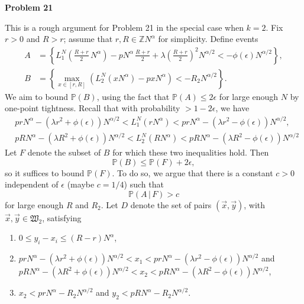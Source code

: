\documentclass[12pt]{article}
\begin{document}
	
	\begin{center}
		\large\textbf{Problem 21}
	\end{center}

	This is a rough argument for Problem 21 in the special case when $k=2$. Fix $r>0$ and $R>r$; assume that $r,R\in\mathbb{Z}N^\alpha$ for simplicity. Define events
	\begin{align*}
	A &= \left\{L_1^N\left(\frac{R+r}{2}\,N^\alpha\right) - pN^\alpha\,\frac{R+r}{2} + \lambda\left(\frac{R+r}{2}\right)^2 N^{\alpha/2} < -\phi(\epsilon)N^{\alpha/2}\right\},\\
	B &= \left\{\max_{x\in[r,R]} \left(L_2^N(xN^\alpha) - pxN^\alpha\right) < -R_2N^{\alpha/2} \right\}.
	\end{align*}
	We aim to bound $\mathbb{P}(B)$, using the fact that $\mathbb{P}(A) \leq 2\epsilon$ for large enough $N$ by one-point tightness. Recall that with probability $>1-2\epsilon$, we have 
	\begin{align*}
	& prN^\alpha - (\lambda r^2+\phi(\epsilon))N^{\alpha/2} < L_1^N(rN^\alpha) <  prN^\alpha - (\lambda r^2-\phi(\epsilon))N^{\alpha/2},\\
	& pRN^\alpha - (\lambda R^2+\phi(\epsilon))N^{\alpha/2} < L_2^N(RN^\alpha) <  pRN^\alpha - (\lambda R^2-\phi(\epsilon))N^{\alpha/2}
	\end{align*}
	Let $F$ denote the subset of $B$ for which these two inequalities hold. Then 
	\[
	\mathbb{P}(B) \leq \mathbb{P}(F) + 2\epsilon,
	\]
	so it suffices to bound $\mathbb{P}(F)$. To do so, we argue that there is a constant $c>0$ independent of $\epsilon$ (maybe $c=1/4$) such that
	\[
	\mathbb{P}(A\,|\,F) > c
	\]
	for large enough $R$ and $R_2$. Let $D$ denote the set of pairs $(\vec{x},\vec{y})$, with $\vec{x},\vec{y}\in\mathfrak{W}_2$, satisfying 
	\begin{enumerate}[label=(\arabic*)]
		
		\item $0\leq y_i - x_i \leq (R-r)N^\alpha$,
		
		\item $prN^\alpha - (\lambda r^2+\phi(\epsilon))N^{\alpha/2} < x_1 <  prN^\alpha - (\lambda r^2-\phi(\epsilon))N^{\alpha/2}$ and $pRN^\alpha - (\lambda R^2+\phi(\epsilon))N^{\alpha/2} < x_2 <  pRN^\alpha - (\lambda R^2-\phi(\epsilon))N^{\alpha/2}$,
		
		\item $x_2 < prN^\alpha - R_2N^{\alpha/2}$ and $y_2 < pRN^\alpha - R_2N^{\alpha/2}$. 
		
	\end{enumerate}
\end{document}
